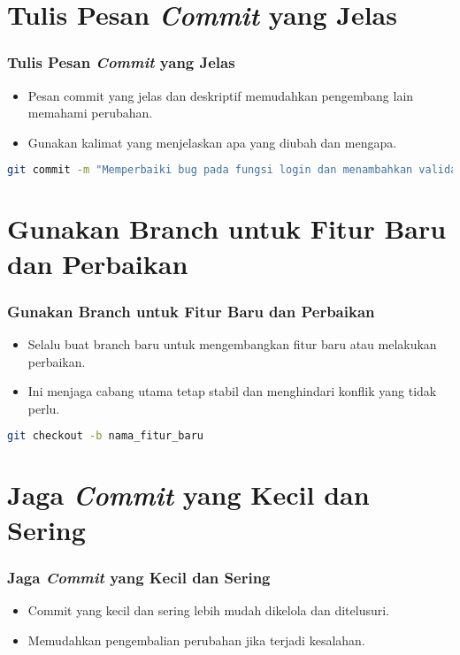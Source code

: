 \documentclass[aspectratio=169, table]{beamer}
\begin{document}
\section{Tulis Pesan \textit{Commit} yang Jelas}
\begin{frame}[fragile]
	\frametitle{Tulis Pesan \textit{Commit} yang Jelas}
	\begin{itemize}
		\item Pesan commit yang jelas dan deskriptif memudahkan pengembang lain memahami perubahan.
		\item Gunakan kalimat yang menjelaskan apa yang diubah dan mengapa.
	\end{itemize}
	\begin{lstlisting}[language=bash]
		git commit -m "Memperbaiki bug pada fungsi login dan menambahkan validasi input"
	\end{lstlisting}
\end{frame}

\section{Gunakan Branch untuk Fitur Baru dan Perbaikan}
\begin{frame}[fragile]
	\frametitle{\LARGE{Gunakan Branch untuk Fitur Baru dan Perbaikan}}
	\begin{itemize}
		\item Selalu buat branch baru untuk mengembangkan fitur baru atau melakukan perbaikan.
		\item Ini menjaga cabang utama tetap stabil dan menghindari konflik yang tidak perlu.
	\end{itemize}
	\begin{lstlisting}[language=bash]
		git checkout -b nama_fitur_baru
	\end{lstlisting}
\end{frame}

\section{Jaga \textit{Commit} yang Kecil dan Sering}
\begin{frame}[fragile]
	\frametitle{Jaga \textit{Commit} yang Kecil dan Sering}
	\begin{itemize}
		\item Commit yang kecil dan sering lebih mudah dikelola dan ditelusuri.
		\item Memudahkan pengembalian perubahan jika terjadi kesalahan.
	\end{itemize}
\end{frame}
\end{document}
